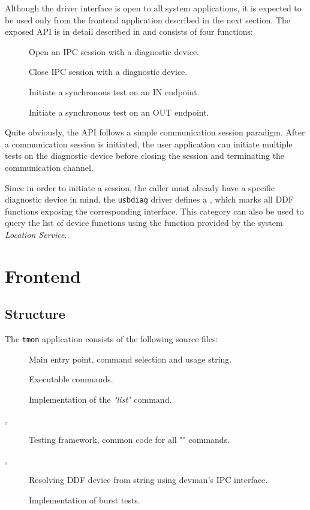 Although the driver interface is open to all system applications, it is expected
to be used only from the frontend application described in the next section. The
exposed API is in detail described in
 and consists of
four functions:
%
\begin{description}
	\item[] Open an IPC session with a diagnostic device.
	\item[] Close IPC session with a diagnostic device.
	\item[] Initiate a synchronous test on an IN endpoint.
	\item[] Initiate a synchronous test on an OUT
		endpoint.
\end{description}

Quite obviously, the API follows a simple communication session paradigm. After
a communication session is initiated, the user application can initiate multiple
tests on the diagnostic device before closing the session and terminating the
communication channel.

Since in order to initiate a session, the caller must already have a specific
diagnostic device in mind, the \texttt{usbdiag} driver defines a
, which marks all DDF functions exposing the
corresponding interface. This category can also be used to query the list of
device functions using the  function provided by the
system \textit{Location Service}.


\section{Frontend}

\subsection{Structure}

The \texttt{tmon} application consists of the following source files:
%
\begin{description}
	\item[]
		Main entry point, command selection and usage string.
	\item[]
		Executable commands.
	\item[]
		Implementation of the \textit{"list"} command.
	\item[, ]
		Testing framework, common code for all "" commands.
	\item[,
		  ]
		Resolving DDF device from string using devman's IPC interface.
	\item[]
		Implementation of burst tests.
\end{description}

